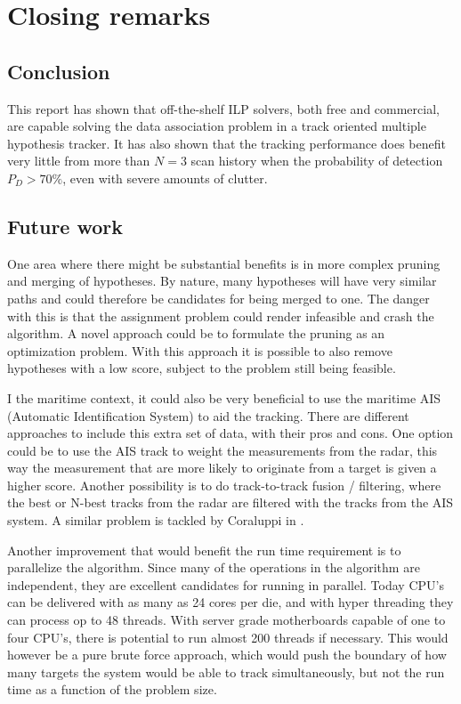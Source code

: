 \section{Closing remarks}
\subsection{Conclusion}
This report has shown that off-the-shelf ILP solvers, both free and commercial, are capable solving the data association problem in a track oriented multiple hypothesis tracker. It has also shown that the tracking performance does benefit very little from more than $N=3$ scan history when the probability of detection $P_D > 70\%$, even with severe amounts of clutter.

\subsection{Future work}
One area where there might be substantial benefits is in more complex pruning and merging of hypotheses. By nature, many hypotheses will have very similar paths and could therefore be candidates for being merged to one. The danger with this is that the assignment problem could render infeasible and crash the algorithm. A novel approach could be to formulate the pruning as an optimization problem. With this approach it is possible to also remove hypotheses with a low score, subject to the problem still being feasible. 

I the maritime context, it could also be very beneficial to use the maritime AIS (Automatic Identification System) to aid the tracking. There are different approaches to include this extra set of data, with their pros and cons. One option could be to use the AIS track to weight the measurements from the radar, this way the measurement that are more likely to originate from a target is given a higher score. Another possibility is to do track-to-track fusion / filtering, where the best or N-best tracks from the radar are filtered with the tracks from the AIS system. A similar problem is tackled by Coraluppi in \cite{Coraluppi2000}.

Another improvement that would benefit the run time requirement is to parallelize  the algorithm. Since many of the operations in the algorithm are independent, they are excellent candidates for running in parallel. Today CPU's can be delivered with as many as 24 cores per die, and with hyper threading they can process op to 48 threads. With server grade motherboards capable of one to four CPU's, there is potential to run almost 200 threads if necessary. This would however be a pure brute force approach, which would push the boundary of how many targets the system would be able to track simultaneously, but not the run time as a function of the problem size.

